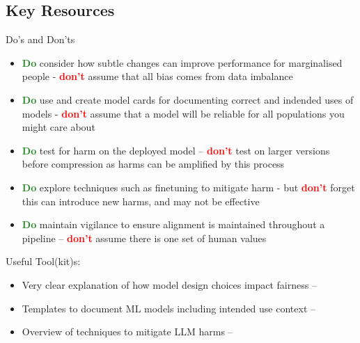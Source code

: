 \subsection{Key Resources}
Do's and Don'ts
\begin{itemize}
    \item \textcolor{ForestGreen}{\textbf{Do}} consider how subtle changes can improve performance for marginalised people - \textcolor{red}{\textbf{don't}} assume that all bias comes from data imbalance 
    \item \textcolor{ForestGreen}{\textbf{Do}} use and create model cards for documenting correct and indended uses of models - \textcolor{red}{\textbf{don't}} assume that a model will be reliable for all populations you might care about
    \item \textcolor{ForestGreen}{\textbf{Do}} test for harm on the deployed model -- \textcolor{red}{\textbf{don't}} test on larger versions before compression as harms can be amplified by this process
    \item \textcolor{ForestGreen}{\textbf{Do}} explore techniques such as finetuning to mitigate harm - but \textcolor{red}{\textbf{don't}} forget this can introduce new harms, and may not be effective
    \item \textcolor{ForestGreen}{\textbf{Do}} maintain vigilance to ensure alignment is maintained throughout a pipeline -- \textcolor{red}{\textbf{don't}} assume there is one set of human values 
\end{itemize}

\noindent Useful Tool(kit)s: 
\begin{itemize}
    \item Very clear explanation of how model design choices impact fairness -- \citet{hooker_moving_2021}
    \item Templates to document ML models including intended use context -- \citet{mitchell_model_2019}
    \item Overview of techniques to mitigate LLM harms -- \citet{kumar_language_2022}
\end{itemize}